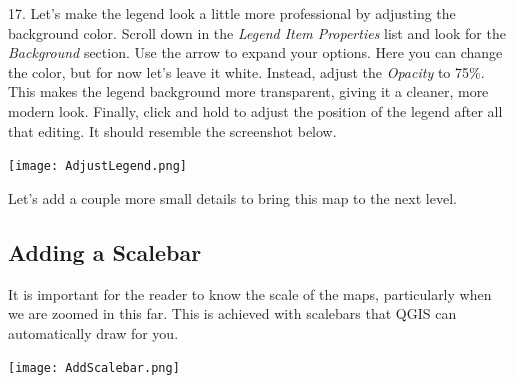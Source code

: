 \documentclass[oneside,a4paper,11pt,explicit]{book}
\begin{document}

17. Let's make the legend look a little more professional by adjusting the background color. Scroll down in the \textit{Legend Item Properties} list and look for the \textit{Background} section. Use the arrow to expand your options. Here you can change the color, but for now let's leave it white. Instead, adjust the \textit{Opacity} to 75\%. This makes the legend background more transparent, giving it a cleaner, more modern look. Finally, click and hold to adjust the position of the legend after all that editing. It should resemble the screenshot below.

\centerline{\texttt{[image: AdjustLegend.png]}}

Let's add a couple more small details to bring this map to the next level.

\subsection{Adding a Scalebar}

It is important for the reader to know the scale of the maps, particularly when we are zoomed in this far. This is achieved with scalebars that QGIS can automatically draw for you.

\centerline{\texttt{[image: AddScalebar.png]}}
\end{document}
